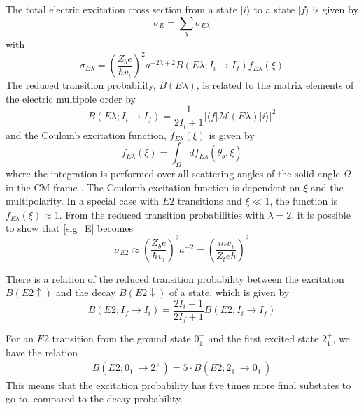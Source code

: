 \documentclass[twoside,english]{uiofysmaster/uiofysmaster}
\let\orgautoref\autoref
\renewcommand{\autoref}
        {%
		 \def\sectionautorefname{Section}%
		 \def\subsectionautorefname{Section}%
		 \def\subsubsectionautorefname{Section}%
		 \def\chapterautorefname{Chapter}%
          \orgautoref}
\begin{document}
The total electric excitation cross section from a state $|i\rangle$ to a state $|f\rangle$ is given by
\begin{equation}\label{tot_sig_E}
	\sigma_E = \sum_\lambda \sigma_{E \lambda}
\end{equation}
with
\begin{equation}\label{sig_E}
	\sigma_{E \lambda} = \left( \frac{Z_b e}{\hbar v_i} \right)^2 a^{-2 \lambda + 2} B(E \lambda; I_i \rightarrow I_f) f_{E \lambda} (\xi)
\end{equation}
The reduced transition probability, $B(E \lambda)$, is related to the matrix elements of the electric multipole order by
\begin{equation}
	B(E \lambda; I_i \rightarrow I_f) = \frac{1}{2I_i + 1} | \langle f | \mathcal{M}(E \lambda)| i \rangle |^2 
\end{equation}
and the Coulomb excitation function, $f_{E \lambda} (\xi)$ is given by
\begin{equation}
	f_{E \lambda} (\xi) = \int_\Omega df_{E \lambda} (\theta_b^{'}, \xi)
\end{equation}
where the integration is performed over all scattering angles of the solid angle $\Omega$ in the CM frame \cite{Niedermaier, EE-Coulex}.
The Coulomb excitation function is dependent on $\xi$ and the multipolarity. 
In a special case with $E2$ transitions and $\xi \ll 1$, the function is $f_{E \lambda} (\xi) \approx 1$.
From the reduced transition probabilities with $\lambda = 2$, it is possible to show that \autoref{sig_E} becomes \cite{NaR}
\begin{equation}
	\sigma_{E2} \approx \left( \frac{Z_b e}{\hbar v_i} \right)^2 a^{-2} = \left( \frac{mv_i}{Z_t e\hbar} \right)^2
\end{equation}

There is a relation of the reduced transition probability between the excitation $B(E2 \uparrow)$ and the decay $B(E2 \downarrow)$ of a state, which is given by 
\begin{equation}
	B(E2; I_f \rightarrow I_i) = \frac{2I_i + 1}{2I_f + 1} B(E2; I_i \rightarrow I_f)
\end{equation}

For an $E2$ transition from the ground state $0_1^+$ and the first excited state $2_1^+$, we have the relation
\begin{align}
	B(E2; 0_1^+ \rightarrow 2_1^+) = 5 \cdot B(E2; 2_1^+ \rightarrow 0_1^+)
\end{align} 
This means that the excitation probability has five times more final substates to go to, compared to the decay probability.
\end{document}
